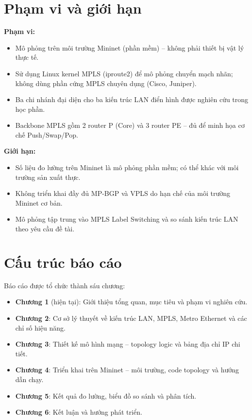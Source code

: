 \section{Phạm vi và giới hạn}

\textbf{Phạm vi:}
\begin{itemize}
    \item Mô phỏng trên môi trường Mininet (phần mềm) – không phải thiết bị vật lý thực tế.
    \item Sử dụng Linux kernel MPLS (iproute2) để mô phỏng chuyển mạch nhãn; không dùng phần cứng MPLS chuyên dụng (Cisco, Juniper).
    \item Ba chi nhánh đại diện cho ba kiến trúc LAN điển hình được nghiên cứu trong học phần.
    \item Backbone MPLS gồm 2 router P (Core) và 3 router PE – đủ để minh họa cơ chế Push/Swap/Pop.
\end{itemize}

\textbf{Giới hạn:}
\begin{itemize}
    \item Số liệu đo lường trên Mininet là mô phỏng phần mềm; có thể khác với môi trường sản xuất thực.
    \item Không triển khai đầy đủ MP-BGP và VPLS do hạn chế của môi trường Mininet cơ bản.
    \item Mô phỏng tập trung vào MPLS Label Switching và so sánh kiến trúc LAN theo yêu cầu đề tài.
\end{itemize}

\section{Cấu trúc báo cáo}

Báo cáo được tổ chức thành sáu chương:
\begin{itemize}
    \item \textbf{Chương 1} (hiện tại): Giới thiệu tổng quan, mục tiêu và phạm vi nghiên cứu.
    \item \textbf{Chương 2}: Cơ sở lý thuyết về kiến trúc LAN, MPLS, Metro Ethernet và các chỉ số hiệu năng.
    \item \textbf{Chương 3}: Thiết kế mô hình mạng – topology logic và bảng địa chỉ IP chi tiết.
    \item \textbf{Chương 4}: Triển khai trên Mininet – môi trường, code topology và hướng dẫn chạy.
    \item \textbf{Chương 5}: Kết quả đo lường, biểu đồ so sánh và phân tích.
    \item \textbf{Chương 6}: Kết luận và hướng phát triển.
\end{itemize}
